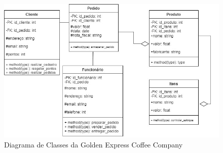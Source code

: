 \begin{figure}[!h]
	\centering
	\includegraphics[width=15cm]{DC}
	\caption{Diagrama de Classes da Golden Express Coffee Company}
\end{figure}
